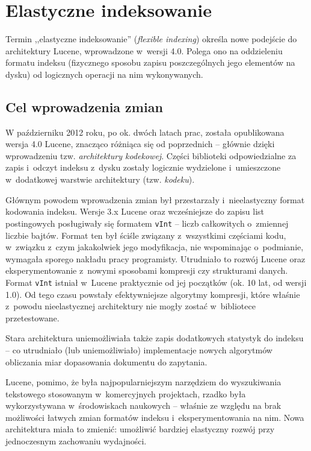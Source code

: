 \chapter{Elastyczne indeksowanie}

Termin ,,elastyczne indeksowanie'' (\emph{flexible indexing}) określa nowe podejście do architektury Lucene, wprowadzone w~wersji 4.0. Polega ono na oddzieleniu formatu indeksu (fizycznego sposobu zapisu poszczególnych jego elementów na dysku) od logicznych operacji na nim wykonywanych.

\section{Cel wprowadzenia zmian}

W październiku 2012 roku, po ok. dwóch latach prac, została opublikowana wersja 4.0 Lucene, znacząco różniąca się od poprzednich -- głównie dzięki wprowadzeniu tzw. \emph{architektury kodekowej}. Części biblioteki odpowiedzialne za zapis i~odczyt indeksu z~dysku zostały logicznie wydzielone i~umieszczone w~dodatkowej warstwie architektury (tzw. \emph{kodeku}). 

Głównym powodem wprowadzenia zmian był przestarzały i~nieelastyczny format kodowania indeksu. Wersje 3.x Lucene oraz wcześniejsze do zapisu list postingowych posługiwały się formatem \texttt{vInt} -- liczb całkowitych o~zmiennej liczbie bajtów. Format ten był ściśle związany z~wszystkimi częściami kodu, w~związku z~czym jakakolwiek jego modyfikacja, nie wspominając o~podmianie, wymagała sporego nakładu pracy programisty. Utrudniało to rozwój Lucene oraz eksperymentowanie z~nowymi sposobami kompresji czy strukturami danych. Format \texttt{vInt} istniał w~Lucene praktycznie od jej początków (ok. 10 lat, od wersji 1.0). Od tego czasu powstały efektywniejsze algorytmy kompresji, które właśnie z~powodu nieelastycznej architektury nie mogły zostać w~bibliotece przetestowane.

Stara architektura uniemożliwiała także zapis dodatkowych statystyk do indeksu -- co utrudniało (lub uniemożliwiało) implementacje nowych algorytmów obliczania miar dopasowania dokumentu do zapytania.

Lucene, pomimo, że była najpopularniejszym narzędziem do wyszukiwania tekstowego stosowanym w~komercyjnych projektach, rzadko była wykorzystywana w~środowiskach naukowych -- właśnie ze względu na brak możliwości łatwych zmian formatów indeksu i~eksperymentowania na nim. Nowa architektura miała to zmienić: umożliwić bardziej elastyczny rozwój przy jednoczesnym zachowaniu wydajności.

